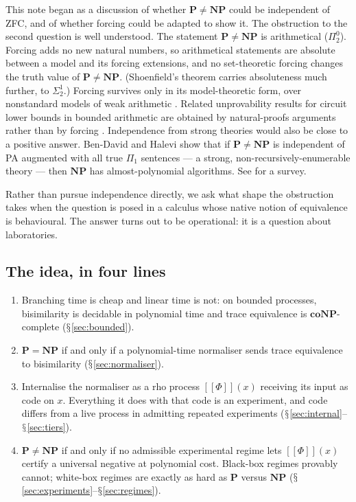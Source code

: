 \documentclass[11pt]{article}
\theoremstyle{definition}
\theoremstyle{plain}
\theoremstyle{remark}
\newcommand{\enc}[1]{[\![#1]\!]}
\DeclareRobustCommand{\S}{\ifmmode\mathsection\else$\mathsection$\fi}
\newcommand{\Pclass}{\mathbf{P}}
\newcommand{\NPclass}{\mathbf{NP}}
\newcommand{\coNP}{\mathbf{coNP}}
\begin{document}
This note began as a discussion of whether $\Pclass \neq \NPclass$ could
be independent of ZFC, and of whether forcing could be adapted to show it.
The obstruction to the second question is well understood. The statement
$\Pclass \neq \NPclass$ is arithmetical ($\Pi^0_2$). Forcing adds no
new natural numbers, so arithmetical statements are absolute between a
model and its forcing extensions, and no set-theoretic forcing changes
the truth value of $\Pclass \neq \NPclass$. (Shoenfield's theorem
\cite{Shoenfield61} carries absoluteness much further, to $\Sigma^1_2$.)
Forcing survives only in its model-theoretic form, over nonstandard
models of weak arithmetic \cite{Krajicek11}. Related unprovability
results for circuit lower bounds in bounded arithmetic are obtained by
natural-proofs arguments rather than by forcing \cite{Razborov95}.
Independence from strong theories would also be close to a positive
answer. Ben-David and Halevi \cite{BenDavidHalevi92} show that if
$\Pclass \neq \NPclass$ is independent of PA augmented with all true
$\Pi_1$ sentences --- a strong, non-recursively-enumerable theory ---
then $\NPclass$ has almost-polynomial algorithms. See \cite{Aaronson03}
for a survey.

Rather than pursue independence directly, we ask what shape the
obstruction takes when the question is posed in a calculus whose native
notion of equivalence is behavioural. The answer turns out to be
operational: it is a question about laboratories.

\subsection*{The idea, in four lines}

\begin{enumerate}[label=(\arabic*),leftmargin=2.2em]
\item Branching time is cheap and linear time is not: on bounded
processes, bisimilarity is decidable in polynomial time and trace
equivalence is $\coNP$-complete (\S\ref{sec:bounded}).

\item $\Pclass = \NPclass$ if and only if a polynomial-time normaliser
sends trace equivalence to bisimilarity (\S\ref{sec:normaliser}).

\item Internalise the normaliser as a rho process $\enc{\Phi}(x)$
receiving its input as code on $x$. Everything it does with that code is
an experiment, and code differs from a live process in admitting repeated
experiments (\S\ref{sec:internal}--\S\ref{sec:tiers}).

\item $\Pclass \neq \NPclass$ if and only if no admissible experimental
regime lets $\enc{\Phi}(x)$ certify a universal negative at polynomial
cost. Black-box regimes provably cannot; white-box regimes are exactly as
hard as $\Pclass$ versus $\NPclass$ (\S\ref{sec:experiments}--\S\ref{sec:regimes}).
\end{enumerate}
\end{document}
